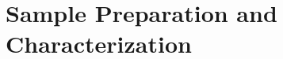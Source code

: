 \setcounter{chapter}{2}
\chapter{Sample Preparation and Characterization}
\pagestyle{headings}
\label{samprep}









